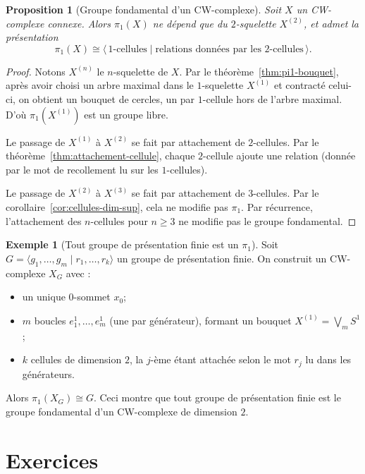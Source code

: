 \documentclass[12pt,a4paper,openany]{book}
\theoremstyle{definition}
\newtheorem{exemple}[definition]{Exemple}
\theoremstyle{plain}
\newtheorem{proposition}[definition]{Proposition}
\theoremstyle{remark}
\begin{document}
\begin{proposition}[Groupe fondamental d'un CW-complexe]\label{prop:pi1-cw}
Soit $X$ un CW-complexe connexe. Alors $\pi_1(X)$ ne dépend que du $2$-squelette $X^{(2)}$,
et admet la présentation
\[
\pi_1(X) \cong \langle\, \text{$1$-cellules} \mid \text{relations données par les $2$-cellules} \,\rangle.
\]
\end{proposition}

\begin{proof}
Notons $X^{(n)}$ le $n$-squelette de $X$. Par le théorème~\ref{thm:pi1-bouquet},
après avoir choisi un arbre maximal dans le $1$-squelette $X^{(1)}$ et contracté celui-ci,
on obtient un bouquet de cercles, un par $1$-cellule hors de l'arbre maximal. D'où
$\pi_1(X^{(1)})$ est un groupe libre.

Le passage de $X^{(1)}$ à $X^{(2)}$ se fait par attachement de $2$-cellules.
Par le théorème~\ref{thm:attachement-cellule}, chaque $2$-cellule ajoute une relation
(donnée par le mot de recollement lu sur les $1$-cellules).

Le passage de $X^{(2)}$ à $X^{(3)}$ se fait par attachement de $3$-cellules. Par le
corollaire~\ref{cor:cellules-dim-sup}, cela ne modifie pas $\pi_1$. Par récurrence,
l'attachement des $n$-cellules pour $n \geq 3$ ne modifie pas le groupe fondamental.
\end{proof}

\begin{exemple}[Tout groupe de présentation finie est un $\pi_1$]\label{ex:tout-groupe-pi1}
Soit $G = \langle g_1, \ldots, g_m \mid r_1, \ldots, r_k \rangle$ un groupe de présentation
finie. On construit un CW-complexe $X_G$ avec :
\begin{itemize}
\item un unique $0$-sommet $x_0$;
\item $m$ boucles $e_1^1, \ldots, e_m^1$ (une par générateur), formant un bouquet $X^{(1)} = \bigvee_m S^1$;
\item $k$ cellules de dimension $2$, la $j$-ème étant attachée selon le mot $r_j$ lu dans les générateurs.
\end{itemize}
Alors $\pi_1(X_G) \cong G$. Ceci montre que tout groupe de présentation finie est le groupe
fondamental d'un CW-complexe de dimension $2$.
\end{exemple}

\section{Exercices}\label{sec:exo-vk}
\end{document}
